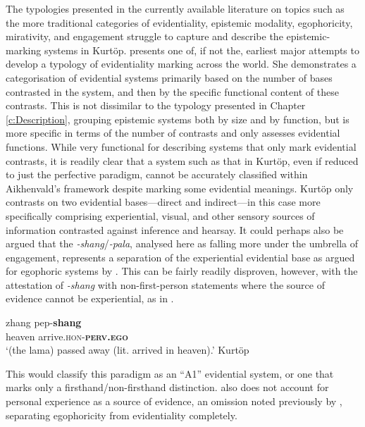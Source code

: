 The typologies presented in the currently available literature on topics such as the more traditional categories of evidentiality, epistemic modality, egophoricity, mirativity, and engagement struggle to capture and describe the epistemic-marking systems in Kurtöp.  presents one of, if not the, earliest major attempts to develop a typology of evidentiality marking across the world. She demonstrates a categorisation of evidential systems primarily based on the number of bases contrasted in the system, and then by the specific functional content of these contrasts. This is not dissimilar to the typology presented in Chapter \ref{c:Description}, grouping epistemic systems both by size and by function, but is more specific in terms of the number of contrasts and only assesses evidential functions. While very functional for describing systems that only mark evidential contrasts, it is readily clear that a system such as that in Kurtöp, even if reduced to just the perfective paradigm, cannot be accurately classified within Aikhenvald's framework despite marking some evidential meanings. Kurtöp only contrasts on two evidential bases---direct and indirect---in this case more specifically comprising experiential, visual, and other sensory sources of information contrasted against inference and hearsay. It could perhaps also be argued that the \textit{-shang}/\textit{-pala}, analysed here as falling more under the umbrella of engagement, represents a separation of the experiential evidential base as argued for egophoric systems by . This can be fairly readily disproven, however, with the attestation of \textit{-shang} with non-first-person statements where the source of evidence cannot be experiential, as in .

\begin{exe}
    \ex\label{e:Discussion:KurtopShang}
    \gll zhang pep-\textbf{shang} \\
    heaven arrive.\textsc{hon-\textbf{perv.ego}} \\
    \glt `(the lama) passed away (lit. arrived in heaven).' Kurtöp \cite[East Bodish: Bhutan,][114]{Hyslop2014}
\end{exe}

This would classify this paradigm as an ``A1'' evidential system, or one that marks only a firsthand/non-firsthand distinction.  also does not account for personal experience as a source of evidence, an omission noted previously by , separating egophoricity from evidentiality completely.

